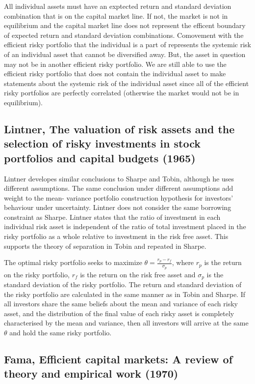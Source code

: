 All individual assets must have an exptected return and standard deviation combination
that is on the capital market line. If not, the market is not in equilibrium and the
capital market line does not represent the efficent boundary of expected return and
standard deviation combinations. Comovement with the efficient risky portfolio that the
individual is a part of represents the systemic risk of an individual asset that cannot be
diversified away. But, the asset in question may not be in another efficient risky
portfolio. We are still able to use the efficient risky portfolio that does not contain
the individual asset to make statements about the systemic risk of the individual asset
since all of the efficient risky portfolios are perfectly correlated (otherwise the market
would not be in equilibrium).

\subsection[Lintner, 1965]{Lintner, The valuation of risk assets and the selection of
risky investments in stock portfolios and capital budgets
(1965)\cite{lintner1965valuation}}

Lintner developes similar conclusions to Sharpe and Tobin, although he uses different
assumptions. The same conclusion under different assumptions add weight to the mean-
variance portfolio construction hypothesis for investors' behaviour under uncertainty.
Lintner does not consider the same borrowing constraint as Sharpe. Lintner states that the
ratio of investment in each individual risk asset is independent of the ratio of total
investment placed in the risky portfolio as a whole relative to investment in the risk
free asset. This supports the theory of separation in Tobin and repeated in Sharpe.

The optimal risky portfolio seeks to maximize $\theta=\frac{r_p-
r_f}{\sigma_p}$, where $r_p$ is the return on the risky portfolio, $r_f$ is
the return on the risk free asset and $\sigma_p$ is the standard deviation of
the risky portfolio. The return and standard deviation of the risky portfolio
are calculated in the same manner as in Tobin and Sharpe. If all investors
share the same beliefs about the mean and variance of each risky asset, and
the distribution of the final value of each risky asset is completely
characterised by the mean and variance, then all investors will arrive at the
same $\theta$ and hold the same risky portfolio.

\subsection[Fama, 1970]{Fama, Efficient capital markets: A review of theory and empirical
work (1970)\cite{malkiel1970efficient}}

